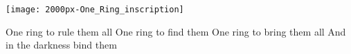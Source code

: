 \documentclass[11pt]{article}
\begin{document}
\begin{minipage}[c]{0.6\textwidth}
\begin{framed}
\texttt{[image: 2000px-One\_Ring\_inscription]}
\end{framed}
\end{minipage}
\begin{minipage}[c]{0.4\textwidth}
\begin{framed}
 One ring to rule them all \newline
 One ring to find them \newline
 One ring to bring them all \newline
 And in the darkness bind them 
\end{framed}
\end{minipage}

\end{document}

